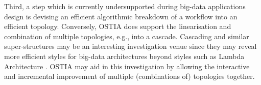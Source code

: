 Third, a step which is currently undersupported during big-data applications design is devising an efficient algorithmic breakdown of a workflow into an efficient topology. Conversely, OSTIA does support the linearisation and combination of multiple topologies, e.g., into a cascade. Cascading and similar super-structures may be an interesting investigation venue since they may reveal more efficient styles for big-data architectures beyond styles such as Lambda Architecture \cite{lambda}. OSTIA may aid in this investigation by allowing the interactive and incremental improvement of multiple (combinations of) topologies together.
